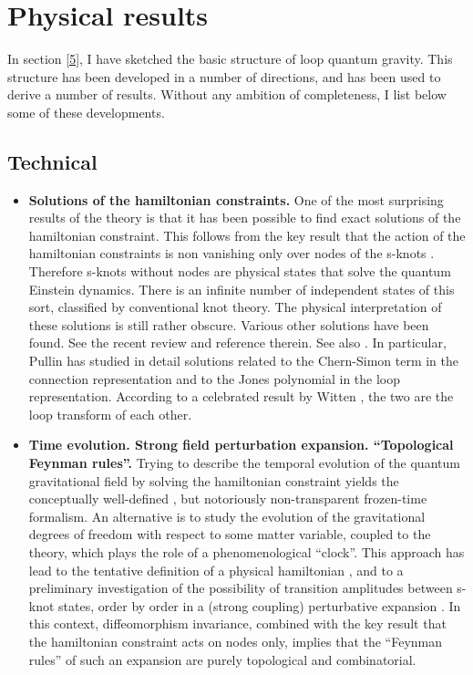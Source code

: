 \documentclass[12pt]{article}
\begin{document}
\section{Physical results}\label{6}

In section \ref{5}, I have sketched the basic structure of loop 
quantum gravity.  This structure has been developed in a number 
of directions, and has been used to derive a number of results.  
Without any ambition of completeness, I list below some of these 
developments.

\subsection{Technical} \label{technical}

\begin{itemize}

\item {\bf Solutions of the hamiltonian constraints.} One of 
the most surprising results of the theory is that it has been 
possible to find exact solutions of the hamiltonian constraint.  
This follows from the key result that the action of the 
hamiltonian constraints is non vanishing only over nodes of 
the s-knots \cite{RovelliSmolin88,RovelliSmolin90}.  Therefore 
s-knots without nodes are physical states that solve the 
quantum Einstein dynamics.  There is an infinite number of 
independent states of this sort, classified by conventional knot 
theory.  The physical interpretation of these solutions is still 
rather obscure.   Various other solutions have been found.  See 
the recent review \cite{Ezawa} and reference therein.  See also 
\cite{Husain,Kodama,Bruegmann2,H5,H4,H6,H7,GambiniPullin,Kauffman94b}. 
In particular, Pullin has 
studied in detail solutions related to the Chern-Simon term in 
the connection representation and to the Jones polynomial in the 
loop representation. According to a celebrated result by Witten 
\cite{Witten}, the two are the loop transform of each other. 

\item {\bf Time evolution.  Strong field perturbation expansion.  
``Topological Feynman rules''.  } Trying to describe the temporal 
evolution of the quantum gravitational field by solving the 
hamiltonian constraint yields the conceptually well-defined 
\cite{RovelliTime}, but notoriously non-transparent 
frozen-time formalism.  An alternative is to study the evolution 
of the gravitational degrees of freedom with respect to some 
matter variable, coupled to the theory, which plays the role of a 
phenomenological ``clock''.  This approach has lead to the 
tentative definition of a physical hamiltonian 
\cite{RovelliSmolin94b,H9}, 
and to a preliminary investigation of the possibility of 
transition amplitudes between s-knot states, order by order in a 
(strong coupling) perturbative expansion \cite{Rovelli95b}.  In 
this context, diffeomorphism invariance, combined with the key 
result that the hamiltonian constraint acts on nodes only, 
implies that the ``Feynman rules'' of such an expansion are purely 
topological and combinatorial.


\end{itemize}
\end{document}
